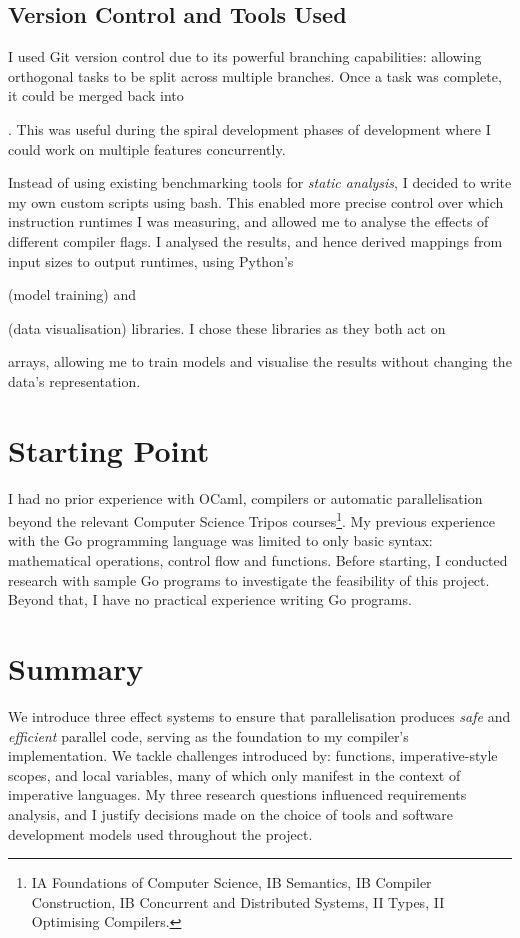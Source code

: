 \subsection{Version Control and Tools Used}

\label{sec:2.7.3}

I used Git version control due to its powerful branching capabilities: allowing orthogonal tasks to be split across multiple branches. Once a task was complete, it could be merged back into . This was useful during the spiral development phases of development where I could work on multiple features concurrently.

Instead of using existing benchmarking tools for \textit{static analysis}, I decided to write my own custom scripts using bash. This enabled more precise control over which instruction runtimes I was measuring, and allowed me to analyse the effects of different compiler flags. I analysed the results, and hence derived mappings from input sizes to output runtimes, using Python's  (model training) and  (data visualisation) libraries. I chose these libraries as they both act on  arrays, allowing me to train models and visualise the results without changing the data's representation.

\section{Starting Point}

\label{sec:2.8}

I had no prior experience with OCaml, compilers or automatic parallelisation beyond the relevant Computer Science Tripos courses\footnote{IA Foundations of Computer Science, IB Semantics, IB Compiler Construction, IB Concurrent and Distributed Systems, II Types, II Optimising Compilers.}. My previous experience with the Go programming language was limited to only basic syntax: mathematical operations, control flow and functions. Before starting, I conducted research with sample Go programs to investigate the feasibility of this project. Beyond that, I have no practical experience writing Go programs.

\section{Summary}

\label{sec:2.9}

We introduce three effect systems to ensure that parallelisation produces \textit{safe} and \textit{efficient} parallel code, serving as the foundation to my compiler's implementation. We tackle challenges introduced by: functions, imperative-style scopes, and local variables, many of which only manifest in the context of imperative languages. My three research questions influenced requirements analysis, and I justify decisions made on the choice of tools and software development models used throughout the project.